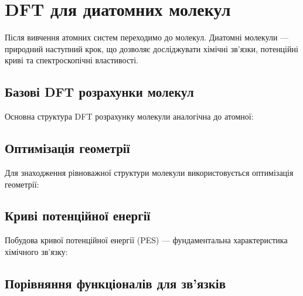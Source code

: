 \section{DFT для диатомних молекул}

Після вивчення атомних систем переходимо до молекул. Диатомні молекули --- природний наступний крок, що дозволяє досліджувати хімічні зв'язки, потенційні криві та спектроскопічні властивості.

\subsection{Базові DFT розрахунки молекул}

Основна структура DFT розрахунку молекули аналогічна до атомної:


\subsection{Оптимізація геометрії}

Для знаходження рівноважної структури молекули використовується оптимізація геометрії:


\subsection{Криві потенційної енергії}

Побудова кривої потенційної енергії (PES) --- фундаментальна характеристика хімічного зв'язку:


\subsection{Порівняння функціоналів для зв'язків}

